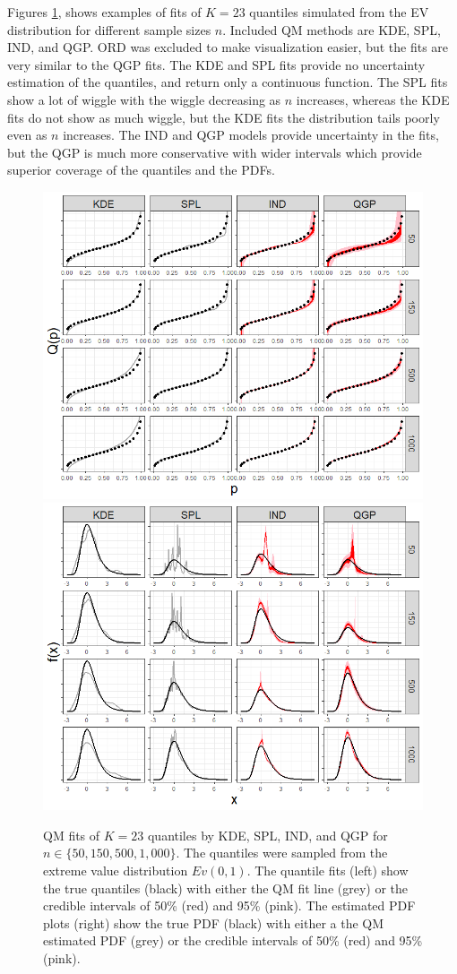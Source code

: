 \documentclass[preprint,12pt,authoryear]{elsarticle}
\newcommand{\1}[1]{\mathds{1}\left[#1\right]}
\begin{document}
Figures \ref{fig:evd_fits}, 
shows examples of fits of $K=23$ quantiles simulated from the EV distribution
for different sample sizes $n$. Included QM methods 
are KDE, SPL, IND, and QGP. ORD was excluded to make visualization easier, but 
the fits are very similar to the QGP fits. The KDE and SPL fits provide no 
uncertainty estimation of the quantiles, and return only a continuous function. 
The SPL fits show a lot of wiggle with the wiggle decreasing as $n$ increases, 
whereas the KDE fits do not show as much wiggle, but the KDE fits the 
distribution tails poorly even as $n$ increases. The IND and QGP models provide 
uncertainty in the fits, but the QGP is much more conservative with wider 
intervals which provide superior coverage of the quantiles and the PDFs. 




\begin{figure}[hbt!]
\centering
  \centering
  \includegraphics[width=.49\linewidth]{Images/quants_evd.png}
  \centering
  \includegraphics[width=.49\linewidth]{Images/dens_evd.png}
\caption{QM fits of $K=23$ quantiles by KDE, SPL, IND, and QGP for 
$n \in \{50, 150, 500, 1{,}000\}$. The quantiles were sampled from the extreme 
value distribution $Ev(0,1)$. The quantile fits (left) show the true quantiles 
(black) with either the QM fit line (grey) or the credible intervals of 50\% 
(red) and 95\% (pink). 
The estimated PDF plots (right) show the true PDF (black) with either a the QM 
estimated PDF (grey) or the credible intervals of 50\% (red) and 95\% (pink).}
\label{fig:evd_fits}
\end{figure}
\end{document}
